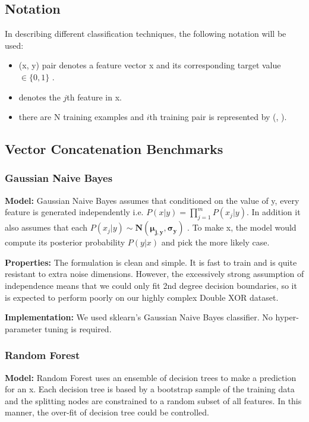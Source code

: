 \documentclass{article}
\begin{document}
\subsection*{Notation}
In describing different classification techniques, the following notation will be used:
\begin{itemize}
\setlength\itemsep{0em}
\item (x, y) pair denotes a feature vector x \mmin {} and its corresponding target value $\in \{0, 1\}$ .
\item {} denotes the $j$th feature in x.
\item there are N training examples and $i$th training pair is represented by (,  ).
\end{itemize}


\subsection*{Vector Concatenation Benchmarks}

\subsubsection*{Gaussian Naive Bayes}
\textbf{Model:}
Gaussian Naive Bayes assumes that conditioned on the value of y, every feature  is generated independently i.e. $P(x|y) = \prod_{j=1}^{m} P(x_j|y)$. In addition it also assumes that each $P(x_j|y) \sim \mathbf{N(\mu_{j,y}, \sigma_y)}$ . To make x, the model would compute its posterior probability $P(y|x)$ and pick the more likely case.

\textbf{Properties:}
The formulation is clean and simple. It is fast to train and is quite resistant to extra noise dimensions.
However, the excessively strong assumption of independence means that we could only fit 2nd degree decision boundaries, so it is expected to perform poorly on our highly complex Double XOR dataset.

\textbf{Implementation:}
We used sklearn's Gaussian Naive Bayes classifier. No hyper-parameter tuning is required.

\subsubsection*{Random Forest}
\textbf{Model:}
Random Forest uses an ensemble of decision trees to make a prediction for an x. Each decision tree is based by a bootstrap sample of the training data and the splitting nodes are constrained to a random subset of all features. In this manner, the over-fit of decision tree could be controlled.
\end{document}
